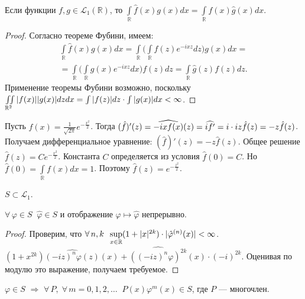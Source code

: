 \documentclass[10pt,titlepage, a4paper]{article}
\begin{document}
\begin{theorem}
Если функции $f,g\in \mathcal{L}_1(\mathbb{R})$, то
$\int\limits_\mathbb{R}\hat
f(x)g(x)dx=\int\limits_\mathbb{R}f(x)\hat g(x)dx$.
\end{theorem}

\begin{proof}
Согласно теореме Фубини, имеем:
\begin{multline*}
\int\limits_\mathbb{R}\hat f(x)g(x)dx=
\int\limits_\mathbb{R}\Big(\int\limits_\mathbb{R}f(z)e^{-ixz}dz\Big)g(x)dx=\\=
\int\limits_\mathbb{R}\Big(\int\limits_\mathbb{R}g(x)e^{-ixz}dx\Big)f(z)dz=
\int\limits_\mathbb{R}\hat g(z)f(z)dz.
\end{multline*}
Применение теоремы Фубини возможно, поскольку
$\iint\limits_{\mathbb{R}^2}|f(x)||g(x)|dzdx\p=\int
|f(z)|dz\cdot\int |g(x)|dx <\infty$.
\end{proof}

\prim

Пусть $f(x)=\frac{1}{\sqrt{2\pi}}e^{-\frac{x^2}{2}}$. Тогда $(\hat
f)'(z)=\widehat {-ixf(x)}(z)=\widehat {if'}=i\cdot iz\hat
f(z)\p=-z\hat f(z)$. Получаем дифференциальное уравнение: $(\hat
f)'(z)=-z\hat f(z)$. Общее решение $\hat f(z)=Ce^{-\frac{x^2}{2}}$.
Константа $C$ определяется из условия $\hat f(0)=C$. Но $\hat
f(0)=\int\limits_{\mathbb{R}}f(x)dx=1$. Поэтому $\hat
f(z)=e^{-\frac{z^2}{2}}$.

\begin{zam}
$S\subset \mathcal{L}_1$.
\end{zam}

\begin{theorem}
$\forall\,\varphi\in S\;\; \hat \varphi\in S$ и отображение $\varphi
\mapsto \hat \varphi$ непрерывно.
\end{theorem}

\begin{proof}
Проверим, что $\forall\, n,k\;\; \sup\limits_{x\in\mathbb{R}}
(1\p+|x|^{2k})\cdot |\hat {\varphi}^{(n)}(x)|<\infty$.
$(1+x^{2k})\widehat {(-iz)^n\varphi(z)}(x)+\widehat
{((-iz)^n\varphi)^{2k}}(x)\cdot (-i)^{2k}$. Оценивая по модулю это
выражение, получаем требуемое.%
\end{proof}

\begin{theorem}
$\varphi\in S$ $\Rightarrow$ $\forall\, P,\; \forall\,
m=0,1,2,\ldots\;\; P(x)\varphi^m(x)\in S$, где $P$ --- многочлен.
\end{theorem}
\end{document}

